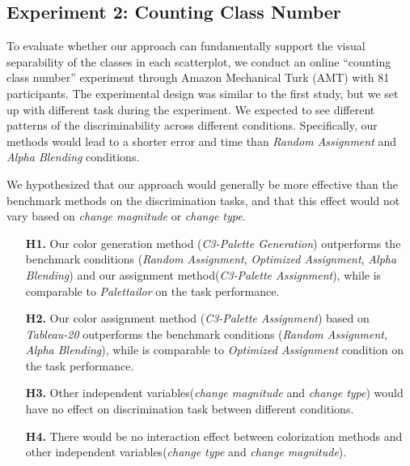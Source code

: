 \subsection{Experiment 2: Counting Class Number}
\label{subsec:onlinestudy2}
To evaluate whether our approach can fundamentally support the visual separability of the classes in each scatterplot, we conduct an online ``counting class number'' experiment through Amazon Mechanical Turk (AMT) with 81 participants. The experimental design was similar to the first study, but we set up with different task during the experiment.
We expected to see different patterns of the discriminability across different conditions. Specifically, our methods would lead to a shorter error and time than \emph{Random Assignment} and \emph{Alpha Blending} conditions.

\vspace{.3em}
 We hypothesized that our approach would generally be more effective than the benchmark methods on the discrimination tasks, and that this effect would not vary based on \emph{change magnitude} or \emph{change type}.
\begin{itemize}[noitemsep]
\setlength{\itemsep}{5pt}
    \item[\textbf{H1.}] Our color generation method (\emph{C3-Palette Generation}) outperforms the benchmark conditions (\emph{Random Assignment}, \emph{Optimized Assignment}, \emph{Alpha Blending}) and our assignment method(\emph{C3-Palette Assignment}), while is comparable to  \emph{Palettailor} on the task performance.

    \item [\textbf{H2.}] Our color assignment method (\emph{C3-Palette Assignment}) based on \emph{Tableau-20} outperforms the benchmark conditions (\emph{Random Assignment}, \emph{Alpha Blending}), while is comparable to \emph{Optimized Assignment} condition on the task performance.

    \item [\textbf{H3.}] Other independent variables(\emph{change magnitude} and \emph{change type}) would have no effect on discrimination task between different conditions.

    \item [\textbf{H4.}] There would be no interaction effect between colorization methods and other independent variables(\emph{change type} and \emph{change magnitude}).
\end{itemize}

